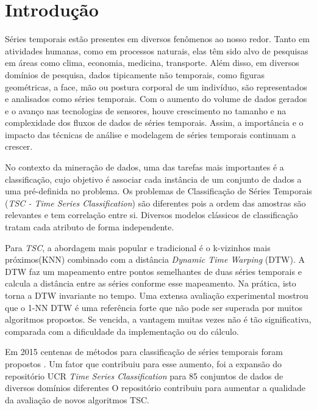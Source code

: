 
\chapter{Introdução} %

Séries temporais estão presentes em diversos fenômenos ao nosso redor. Tanto em atividades humanas, como em processos naturais, elas têm sido alvo de pesquisas em áreas como clima, economia, medicina, transporte. Além disso, em diversos domínios de pesquisa, dados tipicamente não temporais, como figuras geométricas, a face, mão ou postura corporal de um indivíduo, são representados e analisados como séries temporais. Com o aumento do volume de dados gerados e o avanço nas tecnologias de sensores, houve crescimento no tamanho e na complexidade dos fluxos de dados de séries temporais. Assim, a importância e o impacto das técnicas de análise e modelagem de séries temporais continuam a crescer. 

No contexto da mineração de dados, uma das tarefas mais importantes é a classificação, cujo objetivo é associar cada instância de um conjunto de dados a uma pré-definida no problema. Os problemas de Classificação de Séries Temporais (\textit{TSC - Time Series Classification}) são diferentes pois a ordem das amostras são relevantes e tem correlação entre si. Diversos modelos clássicos de classificação tratam cada atributo de forma independente.  

Para \textit{TSC}, a abordagem mais popular e tradicional é o k-vizinhos mais próximos(KNN) combinado com a distância \textit{Dynamic Time Warping} (DTW). A DTW faz um mapeamento entre pontos semelhantes de duas séries temporais e calcula a distância entre as séries conforme esse mapeamento. Na prática, isto torna a DTW invariante no tempo.  Uma extensa avaliação experimental \cite{Bagnall2017} mostrou que o 1-NN DTW é uma referência forte que não pode ser superada por muitos algoritmos propostos. Se vencida, a vantagem muitas vezes não é tão significativa, comparada com a dificuldade da implementação ou do cálculo.

Em 2015 centenas de métodos para classificação de séries temporais foram propostos \cite{Bagnall2017}. Um fator que contribuiu para esse aumento, foi  a expansão do repositório UCR \textit{Time Series Classification} para 85 conjuntos de dados de diversos domínios diferentes  O repositório contribuiu para aumentar a qualidade da avaliação de novos algoritmos TSC. 

